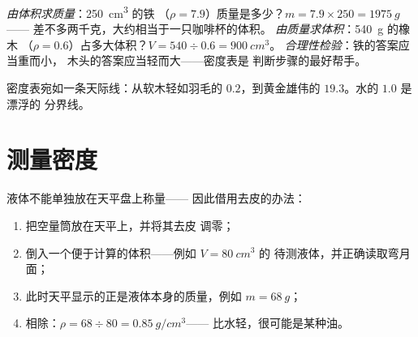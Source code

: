 \begin{example}[算法的应用]\label{ex:g7:volume-mass-density:atwork}
\emph{由体积求质量}：\qty{250}{cm^3} 的铁
（$\rho = 7.9$）质量是多少？$m = 7.9 \times 250 = \qty{1975}{g}$——
差不多两千克，大约相当于一只咖啡杯的体积。
\emph{由质量求体积}：\qty{540}{g} 的橡木
（$\rho = 0.6$）占多大体积？$V = 540 \div 0.6 = \qty{900}{cm^3}$。
\emph{合理性检验}：铁的答案应当重而小，
木头的答案应当轻而大——密度表是
判断步骤的最好帮手。
\end{example}

\begin{omfigure}

{\small 密度表宛如一条天际线：从软木轻如羽毛的
$0.2$，到黄金雄伟的 $19.3$。水的 $1.0$ 是漂浮的
分界线。}
\end{omfigure}

\section{测量密度}

\begin{method}[液体的密度]\label{met:g7:volume-mass-density:liquid}
液体不能单独放在天平盘上称量——
因此借用去皮的办法：
\begin{enumerate}
  \item 把空量筒放在天平上，并将其去皮
        调零；
  \item 倒入一个便于计算的体积——例如 $V = \qty{80}{cm^3}$ 的
        待测液体，并正确读取弯月面；
  \item 此时天平显示的正是液体本身的质量，例如
        $m = \qty{68}{g}$；
  \item 相除：$\rho = 68 \div 80 = \qty{0.85}{g/cm^3}$——
        比水轻，很可能是某种油。
\end{enumerate}
\end{method}

